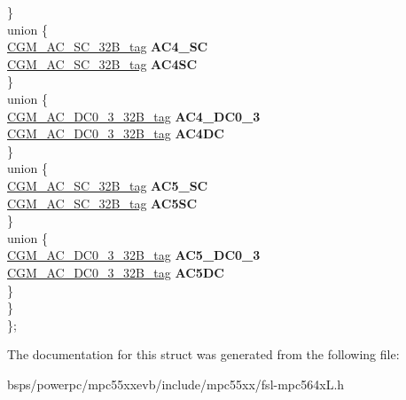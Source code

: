 \begin{DoxyCompactItemize}
\begin{tabbing}
\>\>\} \\
\mbox{\label{structCGM__struct__tag_1_1_0D1678_1_1_0D1686_ac38f7155a2f38a83775669ee39d04bd6}} 
\>\>union \{\\
\>\>\>\mbox{\hyperlink{unionCGM__AC__SC__32B__tag}{CGM\_AC\_SC\_32B\_tag}} {\bfseries AC4\_SC}\\
\>\>\>\mbox{\hyperlink{unionCGM__AC__SC__32B__tag}{CGM\_AC\_SC\_32B\_tag}} {\bfseries AC4SC}\\
\>\>\} \\
\mbox{\label{structCGM__struct__tag_1_1_0D1678_1_1_0D1686_a3c1ed438b116476d40faac4b2fd6cea6}} 
\>\>union \{\\
\>\>\>\mbox{\hyperlink{unionCGM__AC__DC0__3__32B__tag}{CGM\_AC\_DC0\_3\_32B\_tag}} {\bfseries AC4\_DC0\_3}\\
\>\>\>\mbox{\hyperlink{unionCGM__AC__DC0__3__32B__tag}{CGM\_AC\_DC0\_3\_32B\_tag}} {\bfseries AC4DC}\\
\>\>\} \\
\mbox{\label{structCGM__struct__tag_1_1_0D1678_1_1_0D1686_ae332175f8bc14214edd9ec675dbff17f}} 
\>\>union \{\\
\>\>\>\mbox{\hyperlink{unionCGM__AC__SC__32B__tag}{CGM\_AC\_SC\_32B\_tag}} {\bfseries AC5\_SC}\\
\>\>\>\mbox{\hyperlink{unionCGM__AC__SC__32B__tag}{CGM\_AC\_SC\_32B\_tag}} {\bfseries AC5SC}\\
\>\>\} \\
\mbox{\label{structCGM__struct__tag_1_1_0D1678_1_1_0D1686_a9a2e91fad6c13055d99dd3d984323c1f}} 
\>\>union \{\\
\>\>\>\mbox{\hyperlink{unionCGM__AC__DC0__3__32B__tag}{CGM\_AC\_DC0\_3\_32B\_tag}} {\bfseries AC5\_DC0\_3}\\
\>\>\>\mbox{\hyperlink{unionCGM__AC__DC0__3__32B__tag}{CGM\_AC\_DC0\_3\_32B\_tag}} {\bfseries AC5DC}\\
\>\>\} \\
\>\} \\
\}; \\

\end{tabbing}\end{DoxyCompactItemize}


The documentation for this struct was generated from the following file\+:\begin{DoxyCompactItemize}
\item 
bsps/powerpc/mpc55xxevb/include/mpc55xx/fsl-\/mpc564x\+L.\+h\end{DoxyCompactItemize}
